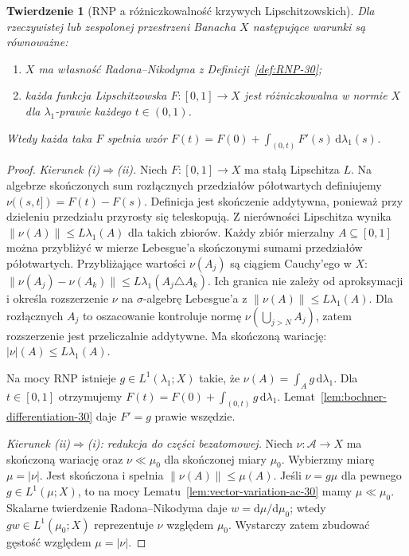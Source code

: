 \documentclass[11pt,a4paper,oneside]{book}
\numberwithin{equation}{chapter}
\theoremstyle{plain}
\newtheorem{twierdzenie}{Twierdzenie}[chapter]
\theoremstyle{definition}
\theoremstyle{remark}
\begin{document}
\begin{twierdzenie}[RNP a różniczkowalność krzywych Lipschitzowskich]
\label{thm:rnp-lipschitz-equiv-30}
Dla rzeczywistej lub zespolonej przestrzeni Banacha $X$
następujące warunki są równoważne:
\begin{enumerate}[label=(\roman*)]
 \item $X$ ma własność Radona--Nikodyma z
       Definicji~\ref{def:RNP-30};
 \item każda funkcja Lipschitzowska
       $F:[0,1]\to X$ jest różniczkowalna w normie $X$
       dla $\lambda_1$-prawie każdego $t\in(0,1)$.
\end{enumerate}
Wtedy każda taka $F$ spełnia wzór
$F(t)=F(0)+\int_{(0,t)}F'(s)\,\mathrm d\lambda_1(s)$.
\end{twierdzenie}
\begin{proof}
\emph{Kierunek (i)$\Rightarrow$(ii).}
Niech $F:[0,1]\to X$ ma stałą Lipschitza $L$.
Na algebrze skończonych sum rozłącznych przedziałów
półotwartych definiujemy
$\nu((s,t])=F(t)-F(s)$. Definicja jest skończenie
addytywna, ponieważ przy dzieleniu przedziału przyrosty
się teleskopują. Z nierówności Lipschitza wynika
$\|\nu(A)\|\le L\lambda_1(A)$ dla takich zbiorów.
Każdy zbiór mierzalny $A\subseteq[0,1]$ można
przybliżyć w mierze Lebesgue'a skończonymi sumami
przedziałów półotwartych. Przybliżające wartości
$\nu(A_j)$ są ciągiem Cauchy'ego w $X$:
$\|\nu(A_j)-\nu(A_k)\|\le L\lambda_1(A_j\triangle A_k)$.
Ich granica nie zależy od aproksymacji i określa
rozszerzenie $\nu$ na $\sigma$-algebrę Lebesgue'a z
$\|\nu(A)\|\le L\lambda_1(A)$. Dla rozłącznych
$A_j$ to oszacowanie kontroluje normę
$\nu(\bigcup_{j>N}A_j)$, zatem rozszerzenie jest
przeliczalnie addytywne. Ma skończoną wariację:
$|\nu|(A)\le L\lambda_1(A)$.

Na mocy RNP istnieje $g\in L^1(\lambda_1;X)$ takie,
że $\nu(A)=\int_Ag\,\mathrm d\lambda_1$.
Dla $t\in[0,1]$ otrzymujemy
$F(t)=F(0)+\int_{(0,t)}g\,\mathrm d\lambda_1$.
Lemat~\ref{lem:bochner-differentiation-30} daje
$F'=g$ prawie wszędzie.

\emph{Kierunek (ii)$\Rightarrow$(i): redukcja do części bezatomowej.}
Niech $\nu:\mathcal A\to X$ ma skończoną wariację
oraz $\nu\ll\mu_0$ dla skończonej miary $\mu_0$.
Wybierzmy miarę $\mu=|\nu|$. Jest skończona i
spełnia $\|\nu(A)\|\le\mu(A)$.
Jeśli $\nu=g\mu$ dla pewnego $g\in L^1(\mu;X)$,
to na mocy Lematu~\ref{lem:vector-variation-ac-30}
mamy $\mu\ll\mu_0$. Skalarne twierdzenie
Radona--Nikodyma daje $w=\mathrm d\mu/\mathrm d\mu_0$;
wtedy $gw\in L^1(\mu_0;X)$ reprezentuje $\nu$
względem $\mu_0$. Wystarczy zatem zbudować
gęstość względem $\mu=|\nu|$.


\end{proof}
\end{document}

